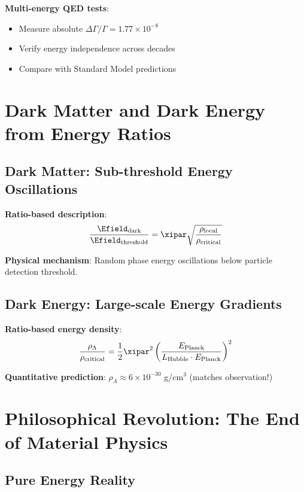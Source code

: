 	\textbf{Multi-energy QED tests}:
	\begin{itemize}
		\item Measure absolute $\Delta\Gamma/\Gamma = 1.77 \times 10^{-8}$
		\item Verify energy independence across decades
		\item Compare with Standard Model predictions
	\end{itemize}
	
	\section{Dark Matter and Dark Energy\\ from Energy Ratios}
	
	\subsection{Dark Matter: Sub-threshold Energy Oscillations}
	
	\textbf{Ratio-based description}:
	\begin{equation}
		\frac{\Efield_{\text{dark}}}{\Efield_{\text{threshold}}} = \xipar \sqrt{\frac{\rho_{\text{local}}}{\rho_{\text{critical}}}}
	\end{equation}
	
	\textbf{Physical mechanism}: Random phase energy oscillations below particle detection threshold.
	
	\subsection{Dark Energy: Large-scale Energy Gradients}
	
	\textbf{Ratio-based energy density}:
	\begin{equation}
		\frac{\rho_{\Lambda}}{\rho_{\text{critical}}} = \frac{1}{2} \xipar^2 \left(\frac{E_{\text{Planck}}}{L_{\text{Hubble}} \cdot E_{\text{Planck}}}\right)^2
	\end{equation}
	
	\textbf{Quantitative prediction}: $\rho_{\Lambda} \approx 6 \times 10^{-30}$ g/cm$^3$ (matches observation!)
	
	\section{Philosophical Revolution: The End of Material Physics}
	
	\subsection{Pure Energy Reality}
	
